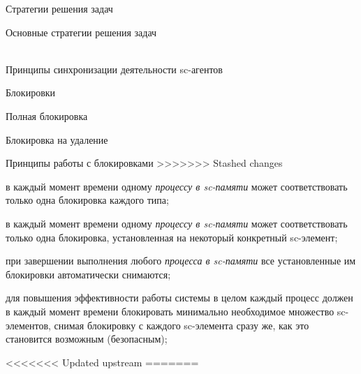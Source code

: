 \begin{frame}{Стратегии решения задач}
\begin{frame}{\large Основные стратегии решения задач}
\begin{textitemize}
\begin{frame}{\\Принципы синхронизации деятельности sc-агентов}
\begin{frame}{Блокировки}
\begin{frame}{ Полная блокировка}
\begin{frame}{Блокировка на удаление}
\begin{frame}{Принципы работы с блокировками}
>>>>>>> Stashed changes
\begin{textitemize}
	\item в каждый момент времени одному \textit{процессу в sc-памяти} может соответствовать только одна блокировка каждого типа;
	\item в каждый момент времени одному \textit{процессу в sc-памяти} может соответствовать только одна блокировка, установленная на некоторый конкретный sc-элемент;
	\item при завершении выполнения любого \textit{процесса в sc-памяти} все установленные им блокировки автоматически снимаются;
	\item для повышения эффективности работы системы в целом каждый процесс должен в каждый момент времени блокировать минимально необходимое множество sc-элементов, снимая блокировку с каждого sc-элемента сразу же, как это становится возможным (безопасным);    
    \end{textitemize}
    \end{frame}
<<<<<<< Updated upstream
=======
    \begin{frame}{}
    \vspace{30}
     \\


\end{frame}
\end{frame}
\end{frame}
\end{frame}
\end{frame}
\end{textitemize}
\end{frame}
\end{frame}
